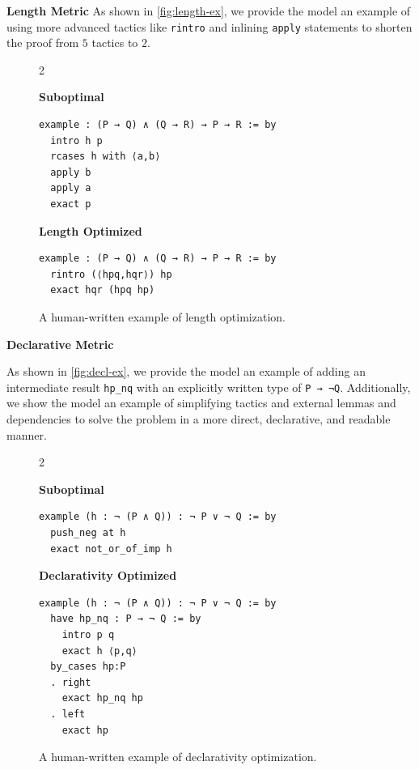 \textbf{Length Metric}
As shown in \autoref{fig:length-ex}, we provide the model an example of using more advanced tactics like \texttt{rintro} and inlining \texttt{apply} statements to shorten the proof from $5$ tactics to $2$.
\setlength{\columnsep}{0.2cm}
\begin{figure}[ht]
\begin{multicols}{2}

{
\textbf{Suboptimal}
\begin{scriptsize}
\begin{lstlisting}[basicstyle=\scriptsize\ttfamily]
example : (P → Q) ∧ (Q → R) → P → R := by
  intro h p
  rcases h with ⟨a,b⟩
  apply b
  apply a
  exact p
\end{lstlisting}
\end{scriptsize}
}
\vfill\null
\columnbreak
{
\textbf{Length Optimized}
\begin{scriptsize}
\begin{lstlisting}[basicstyle=\scriptsize\ttfamily]
example : (P → Q) ∧ (Q → R) → P → R := by
  rintro (⟨hpq,hqr⟩) hp
  exact hqr (hpq hp)
\end{lstlisting}
\end{scriptsize}
}
\end{multicols}
\vspace{-2.5em}
\caption{A human-written example of length optimization.}
\label{fig:length-ex}
\end{figure}




\textbf{Declarative Metric}

As shown in \autoref{fig:decl-ex}, we provide the model an example of adding an intermediate result \texttt{hp\_nq} with an explicitly written type of \texttt{P → ¬Q}. Additionally, we show the model an example of simplifying tactics and external lemmas and dependencies to solve the problem in a more direct, declarative, and readable manner.

\setlength{\columnsep}{0.2cm}
\begin{figure}[ht]
\begin{multicols}{2}

{
\textbf{Suboptimal}
\begin{scriptsize}
\begin{lstlisting}[basicstyle=\scriptsize\ttfamily]
example (h : ¬ (P ∧ Q)) : ¬ P ∨ ¬ Q := by
  push_neg at h
  exact not_or_of_imp h
\end{lstlisting}
\end{scriptsize}
}
\vfill\null
\columnbreak
{
\textbf{Declarativity Optimized}
\begin{scriptsize}
\begin{lstlisting}[basicstyle=\scriptsize\ttfamily]
example (h : ¬ (P ∧ Q)) : ¬ P ∨ ¬ Q := by
  have hp_nq : P → ¬ Q := by
    intro p q
    exact h ⟨p,q⟩
  by_cases hp:P
  . right
    exact hp_nq hp
  . left
    exact hp
\end{lstlisting}
\end{scriptsize}
}
\end{multicols}
\vspace{-2.5em}
\caption{A human-written example of declarativity optimization.}
\label{fig:decl-ex}
\end{figure}




